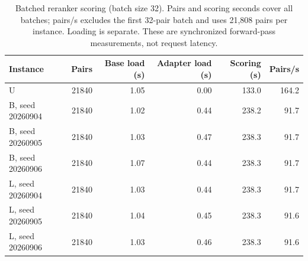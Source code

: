 \begin{table}[htbp]\centering\small
\caption{Batched reranker scoring (batch size 32). Pairs and scoring seconds cover all batches; pairs/s excludes the first 32-pair batch and uses 21,808 pairs per instance. Loading is separate. These are synchronized forward-pass measurements, not request latency.}\label{tab:rerankcost}
\begin{tabular}{lrrrrr}\toprule
Instance & Pairs & Base load (s) & Adapter load (s) & Scoring (s) & Pairs/s\\\midrule
U & 21840 & 1.05 & 0.00 & 133.0 & 164.2\\
B, seed 20260904 & 21840 & 1.02 & 0.44 & 238.2 & 91.7\\
B, seed 20260905 & 21840 & 1.03 & 0.47 & 238.3 & 91.7\\
B, seed 20260906 & 21840 & 1.07 & 0.44 & 238.3 & 91.7\\
L, seed 20260904 & 21840 & 1.03 & 0.44 & 238.3 & 91.7\\
L, seed 20260905 & 21840 & 1.04 & 0.45 & 238.3 & 91.6\\
L, seed 20260906 & 21840 & 1.03 & 0.46 & 238.3 & 91.6\\
\bottomrule\end{tabular}\end{table}
